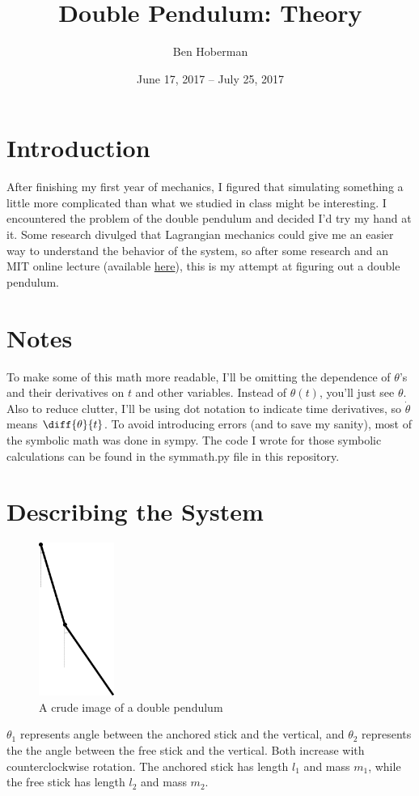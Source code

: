\documentclass[]{article}
\title{Double Pendulum: Theory}
\author{Ben Hoberman}
\begin{document}
	
\date{June 17, 2017 -- July 25, 2017}
\maketitle

\newcommand{\lagr}{\mathcal{L}}

\section{Introduction}
After finishing my first year of mechanics, I figured that simulating something a little more complicated than what we studied in class might be interesting. I encountered the problem of the double pendulum and decided I'd try my hand at it. Some research divulged that Lagrangian mechanics could give me an easier way to understand the behavior of the system, so after some research and an MIT online lecture (available \href{https://www.youtube.com/watch?v=zhk9xLjrmi4&t=3925s}{here}), this is my attempt at figuring out a double pendulum.

\section{Notes}
To make some of this math more readable, I'll be omitting the dependence of $\theta$'s and their derivatives on $t$ and other variables. Instead of $\theta{(t)}$, you'll just see $\theta$. Also to reduce clutter, I'll be using dot notation to indicate time derivatives, so $\dot{\theta}$ means $\diff{\theta}{t}$. To avoid introducing errors (and to save my sanity), most of the symbolic math was done in sympy. The code I wrote for those symbolic calculations can be found in the symmath.py file in this repository.

\section{Describing the System}
\begin{figure}[h!]
	\includegraphics[height=5cm]{situation}
	\caption{A crude image of a double pendulum}
\end{figure}
$\theta_1$ represents angle between the anchored stick and the vertical, and $\theta_2$ represents the the angle between the free stick and the vertical. Both increase with counterclockwise rotation. The anchored stick has length $l_1$ and mass $m_1$, while the free stick has length $l_2$ and mass $m_2$.
\end{document}
